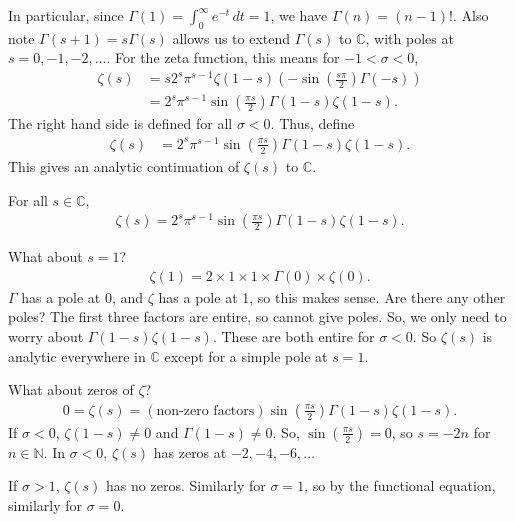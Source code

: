 \documentclass{article}
\newcommand{\1}{\mathbbm{1}}
\begin{document}
In particular, since $\Gamma(1) = \int_0^\infty e^{-t}\,dt = 1$, we have $\Gamma(n) = (n-1)!$.
Also note $\Gamma(s+1)=s\Gamma(s)$ allows us to extend $\Gamma(s)$ to $\mathbb{C}$, with poles at $s=0,-1,-2,\dotsc$.
For the zeta function, this means for $-1 < \sigma < 0$,
\begin{align*}
  \zeta(s) &= s 2^s \pi^{s-1} \zeta(1-s) (-\sin(\tfrac{s\pi}{2}) \Gamma(-s)) \\
           &= 2^s \pi^{s-1} \sin(\tfrac{\pi s}{2})\Gamma(1-s)\zeta(1-s).
\end{align*}
The right hand side is defined for all $\sigma < 0$.
Thus, define
\begin{align*}
  \zeta(s) &= 2^s \pi^{s-1} \sin(\tfrac{\pi s}{2})\Gamma(1-s)\zeta(1-s).
\end{align*}
This gives an analytic continuation of $\zeta(s)$ to $\mathbb{C}$.
\begin{thm}
  For all $s \in \mathbb{C}$,
  \begin{align*}
    \zeta(s) = 2^s \pi^{s-1} \sin(\tfrac{\pi s}{2}) \Gamma(1-s)\zeta(1-s).
  \end{align*}
\end{thm}
What about $s=1$?
\begin{align*}
  \zeta(1) = 2\times 1 \times 1 \times \Gamma(0) \times \zeta(0).
\end{align*}
$\Gamma$ has a pole at $0$, and $\zeta$ has a pole at 1, so this makes sense.
Are there any other poles? The first three factors are entire, so cannot give poles. So, we only need to worry about $\Gamma(1-s) \zeta(1-s)$.
These are both entire for $\sigma<0$.
So $\zeta(s)$ is analytic everywhere in $\mathbb{C}$ except for a simple pole at $s=1$.

What about zeros of $\zeta$?
\begin{align*}
  0 = \zeta(s) = (\text{non-zero factors}) \sin(\frac{\pi s}{2}) \Gamma(1-s) \zeta(1-s).
\end{align*}
If $\sigma < 0$, $\zeta(1-s) \neq 0$ and $\Gamma(1-s) \neq 0$. So, $\sin(\frac{\pi s}{2}) = 0$, so $s = -2n$ for $n \in \mathbb{N}$.
In $\sigma < 0$, $\zeta(s)$ has zeros at $-2, -4, -6, \dotsc$

If $\sigma > 1$, $\zeta(s)$ has no zeros. Similarly for $\sigma=1$, so by the functional equation, similarly for $\sigma=0$.
\end{document}
